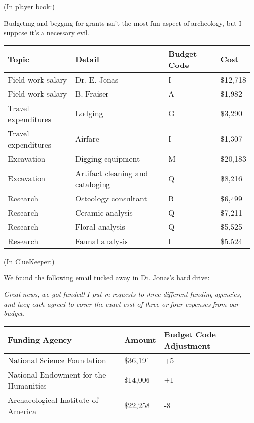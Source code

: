(In player book:)

Budgeting and begging for grants isn't the most fun aspect of
archeology, but I suppose it's a necessary evil.

\begin{center}
\begin{tabular}{llll}
\textbf{Topic}      & \textbf{Detail}                  & \textbf{Budget Code} & \textbf{Cost}     \\\hline
Field work salary   & Dr. E. Jonas                     & I           & \$12,718 \\
Field work salary   & B. Fraiser                       & A           & \$1,982  \\
Travel expenditures & Lodging                          & G           & \$3,290  \\
Travel expenditures & Airfare                          & I           & \$1,307  \\
Excavation          & Digging equipment                & M           & \$20,183 \\
Excavation          & Artifact cleaning and cataloging & Q           & \$8,216  \\
Research            & Osteology consultant             & R           & \$6,499  \\
Research            & Ceramic analysis                 & Q           & \$7,211  \\
Research            & Floral analysis                  & Q           & \$5,525  \\
Research            & Faunal analysis                  & I           & \$5,524 
\end{tabular}
\end{center}

(In ClueKeeper:)

We found the following email tucked away in Dr. Jonas's hard drive:

\textit{Great news, we got funded! I put in requests to three different funding agencies,
and they each agreed to cover the exact cost of three or four expenses from our budget.}

\begin{center}
\begin{tabular}{lll}
\textbf{Funding Agency}                        & \textbf{Amount}   & \textbf{Budget Code Adjustment} \\\hline
National Science Foundation           & \$36,191 & +5                     \\
National Endowment for the Humanities & \$14,006 & +1                     \\
Archaeological Institute of America   & \$22,258 & -8                    
\end{tabular}
\end{center}
